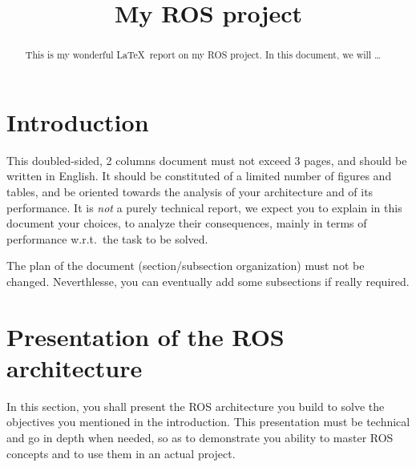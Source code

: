 \documentclass[conference]{IEEEtran}
\begin{document}
\title{My ROS project}

\author{
    \and
}

\maketitle

\begin{abstract}
    This is my wonderful \LaTeX~report on my ROS project. In this document, we will \ldots
\end{abstract}

\section{Introduction}
This doubled-sided, 2 columns document must not exceed 3 pages, and should be written in English. It
should be constituted of a limited number of figures and tables, and be oriented towards the
analysis of your architecture and of its performance. It is \emph{not} a purely technical report, we
expect you to explain in this document your choices, to analyze their consequences, mainly in terms
of performance w.r.t.\ the task to be solved.

The plan of the document (section/subsection organization) must not be changed. Neverthlesse, you
can eventually add some subsections if really required.

\section{Presentation of the ROS architecture}
In this section, you shall present the ROS architecture you build to solve the objectives you
mentioned in the introduction. This presentation must be technical and go in depth when needed, so
as to demonstrate you ability to master ROS concepts and to use them in an actual project.
\end{document}
